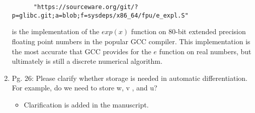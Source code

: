 \documentclass{article}
\begin{document}
\begin{enumerate}
{\begin{itemize}
      \begin{verbatim}
      "https://sourceware.org/git/?p=glibc.git;a=blob;f=sysdeps/x86_64/fpu/e_expl.S"
      \end{verbatim}

      is the implementation of the $exp(x)$ function on 80-bit extended
      precision floating point numbers in the popular GCC compiler. This
      implementation is the most accurate that GCC provides for the $e$
      function on real numbers, but ultimately is still a discrete numerical
      algorithm.

  \end{itemize}}

  \item
Pg. 26: Please clarify whether storage is needed in automatic differentiation. For
example, do we need to store w, v , and u?

{\color{red}  
\begin{itemize}
     \item
      Clarification is added in the manuscript.  
  \end{itemize}}

\end{enumerate}
\end{document}
